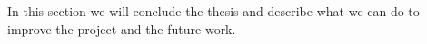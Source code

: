 In this section we will conclude the thesis and describe what we can do to improve the project and the future work.
